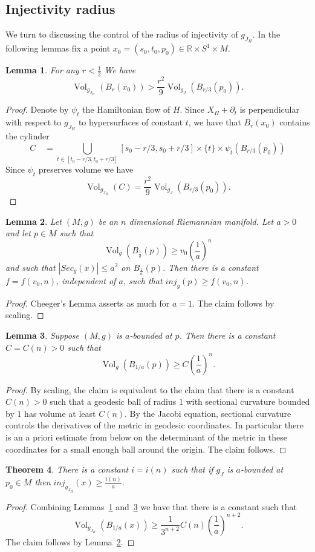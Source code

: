 \documentclass[11pt]{amsart}
\newcommand{\R}{\mathbb{R}}
\DeclareMathOperator{\vol}{Vol}
\newtheorem{tm}{Theorem}[section]
\newtheorem{lm}[tm]{Lemma}
\theoremstyle{definition}
\theoremstyle{remark}
\begin{document}
\subsection{Injectivity radius}\label{subsubinj}
We turn to discussing the control of the radius of injectivity of $g_{J_H}$. In the following lemmas fix a point $x_0=(s_0,t_0,p_0)\in \R\times S^1\times M$.
\begin{lm}\label{lmVolEst1}
 For any $r<\frac12$ We have
\[
\vol_{g_{J_H}}(B_r(x_0))> \frac{r^2}{9}\vol_{g_J}(B_{r/3}(p_0)).
\]
\end{lm}
\begin{proof}
Denote by $\psi_t$ the Hamiltonian flow of $H$. Since $X_H+\partial_t$ is perpendicular with respect to $g_{J_H}$ to hypersurfaces of constant $t$, we have that $B_r(x_0)$ contains the cylinder
\[
C\quad=\bigcup_{t\in [t_0-r/3,t_0+r/3]} [s_0-r/3,s_0+r/3]\times\{t\}
\times\psi_t(B_{r/3}(p_0))\]
Since $\psi_t$ preserves volume we have
\[
\vol_{g_{J_H}}(C)=\frac{r^2}{9}\vol_{g_J}(B_{r/3}(p_0)).
\]
\end{proof}
\begin{lm}\label{lmCheeger}
Let $(M,g)$ be an $n$ dimensional Riemannian manifold. Let $a>0$ and let $p\in M$ such that
\[
\vol_g\left(B_{\frac1a}(p)\right)\geq v_0\left(\frac1{a}\right)^n
\]
and such that $|Sec_g(x)|\leq a^2$ on $B_{\frac1a}(p)$. Then there is a constant $f=f(v_0,n)$, independent of $a$, such that $inj_g(p)\geq f(v_0,n)$.
\end{lm}
\begin{proof}
Cheeger's Lemma asserts as much for $a=1$. The claim follows by scaling.
\end{proof}
\begin{lm}\label{lmVolEst2}
Suppose $(M,g)$ is $a$-bounded at $p$. Then there is a constant $C=C(n)>0$ such that
\[
\vol_g(B_{1/a}(p))\geq C\left(\frac1{a}\right)^n.
\]
\end{lm}
\begin{proof}
By scaling, the claim is equivalent to the claim that there is a constant $C(n)>0$ such that a geodesic ball of radius $1$ with sectional curvature bounded by $1$ has volume at least $C(n)$. By the Jacobi equation, sectional curvature controls the derivatives of the metric in geodesic coordinates.  In particular there is an a priori estimate from below on the determinant of the metric in these coordinates for a small enough ball around the origin. The claim follows.
\end{proof}
\begin{tm}\label{injEst}
There is a constant $i=i(n)$ such that if $g_J$ is $a$-bounded at $p_0\in M$ then $inj_{g_{J_H}}(x)\geq\frac{i(n)}{a}$.
\end{tm}
\begin{proof}
Combining Lemmas~\ref{lmVolEst1} and~\ref{lmVolEst2} we have that there is a constant such that
\[
\vol_{g_{J_H}}(B_{1/a}(x))\geq \frac{1}{3^{n+2}}C(n)\left(\frac1{a}\right)^{n+2}.
\]
The claim follows by Lemma~\ref{lmCheeger}.
\end{proof}
\end{document}
